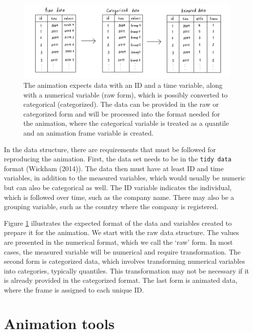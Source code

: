 \begin{figure}

{\centering \includegraphics[width=1\linewidth]{figures/data-diagram} 

}

\caption{The animation expects data with an ID and a time variable, along with a numerical variable (raw form), which is possibly converted to categorical (categorized). The data can be provided in the raw or categorized form and will be processed into the format needed for the animation, where the categorical variable is treated as a quantile and an animation frame variable is created.}\label{fig:data-diagram}
\end{figure}

In the data structure, there are requirements that must be followed for reproducing the animation. First, the data set needs to be in the \texttt{tidy\ data} format (Wickham (2014)). The data then must have at least ID and time variables, in addition to the measured variables, which would usually be numeric but can also be categorical as well. The ID variable indicates the individual, which is followed over time, such as the company name. There may also be a grouping variable, such as the country where the company is registered.

Figure \ref{fig:data-diagram} illustrates the expected format of the data and variables created to prepare it for the animation. We start with the raw data structure. The values are presented in the numerical format, which we call the `raw' form. In most cases, the measured variable will be numerical and require transformation. The second form is categorized data, which involves transforming numerical variables into categories, typically quantiles. This transformation may not be necessary if it is already provided in the categorized format. The last form is animated data, where the frame is assigned to each unique ID.

\hypertarget{animation}{%
\section{Animation tools}\label{animation}}

